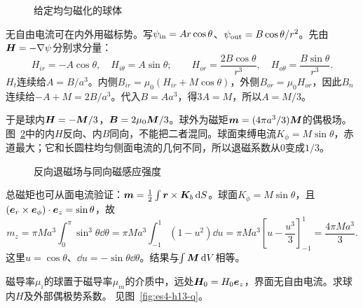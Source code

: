 \begin{figure}[H]\centering
{}
\caption{给定均匀磁化的球体}\label{fig:es4-h12-q}
\end{figure}
\begin{solution}
无自由电流可在内外用磁标势。写$\psi_{\rm in}=Ar\cos\theta$、$\psi_{\rm out}=B\cos\theta/r^2$。先由$\bm{H}=-\nabla\psi$分别求分量：
\[H_{ir}=-A\cos\theta,\quad H_{i\theta}=A\sin\theta;
\qquad H_{or}=\frac{2B\cos\theta}{r^3},\quad
H_{o\theta}=\frac{B\sin\theta}{r^3}.
\]
$H_t$连续给$A=B/a^3$。内侧$B_{ir}=\mu_0(H_{ir}+M\cos\theta)$，外侧$B_{or}=\mu_0H_{or}$，因此$B_n$连续给$-A+M=2B/a^3$。代入$B=Aa^3$，得$3A=M$，所以$A=M/3$。

于是球内$\bm{H}=-\bm{M}/3$，$\bm{B}=2\mu_0\bm{M}/3$。球外为磁矩$\bm{m}=(4\pi a^3/3)\bm{M}$的偶极场。图~\ref{fig:es4-h12-s}中的内$H$反向、内$B$同向，不能把二者混同。球面束缚电流$K_\phi=M\sin\theta$，赤道最大；它和长圆柱均匀侧面电流的几何不同，所以退磁系数从0变成$1/3$。
\begin{figure}[H]\centering
{}
\caption{反向退磁场与同向磁感应强度}\label{fig:es4-h12-s}
\end{figure}


总磁矩也可从面电流验证：$\bm{m}=\tfrac12\int\bm{r}\times\bm{K}_b\mathop{}\!\mathrm d S$。球面$K_\phi=M\sin\theta$，且$(\bm{e}_r\times\bm{e}_\phi)\cdot\bm{e}_z=\sin\theta$，故
\[m_z=\pi Ma^3\int_0^\pi\sin^3\theta\dd\theta
=\pi Ma^3\int_{-1}^1(1-u^2)\dd u
=\pi Ma^3\left[u-\frac{u^3}3\right]_{-1}^1
=\frac{4\pi Ma^3}3.\]
这里$u=\cos\theta$、$\dd u=-\sin\theta\dd\theta$。结果与$\int\bm{M}\mathop{}\!\mathrm d V$相等。
\end{solution}

\begin{exercise}[线性磁介质球在匀强场中]\label{ex:es4-h13}
磁导率$\mu_i$的球置于磁导率$\mu_m$的介质中，远处$\bm{H}_0=H_0\bm{e}_z$，界面无自由电流。求球内$H$及外部偶极势系数。 见图~\ref{fig:es4-h13-q}。
\end{exercise}

